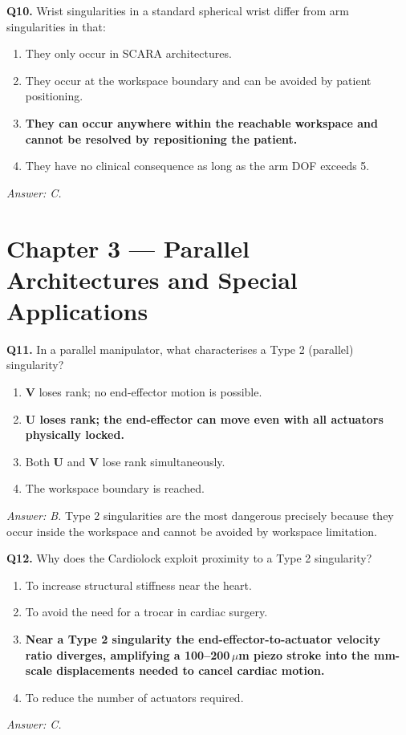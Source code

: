 \documentclass[11pt,a4paper,twoside]{report}
\begin{document}
\bigskip
\textbf{Q10.} Wrist singularities in a standard spherical wrist differ from arm singularities in that:
\begin{enumerate}[label=\Alph*.]
    \item They only occur in SCARA architectures.
    \item They occur at the workspace boundary and can be avoided by patient positioning.
    \item \textbf{They can occur anywhere within the reachable workspace and cannot be resolved by repositioning the patient.}
    \item They have no clinical consequence as long as the arm DOF exceeds 5.
\end{enumerate}
\textit{Answer: C.}

\section{Chapter 3 — Parallel Architectures and Special Applications}

\textbf{Q11.} In a parallel manipulator, what characterises a Type 2 (parallel) singularity?
\begin{enumerate}[label=\Alph*.]
    \item $\mathbf{V}$ loses rank; no end-effector motion is possible.
    \item \textbf{$\mathbf{U}$ loses rank; the end-effector can move even with all actuators physically locked.}
    \item Both $\mathbf{U}$ and $\mathbf{V}$ lose rank simultaneously.
    \item The workspace boundary is reached.
\end{enumerate}
\textit{Answer: B.} Type 2 singularities are the most dangerous precisely because they occur inside the workspace and cannot be avoided by workspace limitation.

\bigskip
\textbf{Q12.} Why does the Cardiolock exploit proximity to a Type 2 singularity?
\begin{enumerate}[label=\Alph*.]
    \item To increase structural stiffness near the heart.
    \item To avoid the need for a trocar in cardiac surgery.
    \item \textbf{Near a Type 2 singularity the end-effector-to-actuator velocity ratio diverges, amplifying a 100--200\,$\mu$m piezo stroke into the mm-scale displacements needed to cancel cardiac motion.}
    \item To reduce the number of actuators required.
\end{enumerate}
\textit{Answer: C.}
\end{document}
